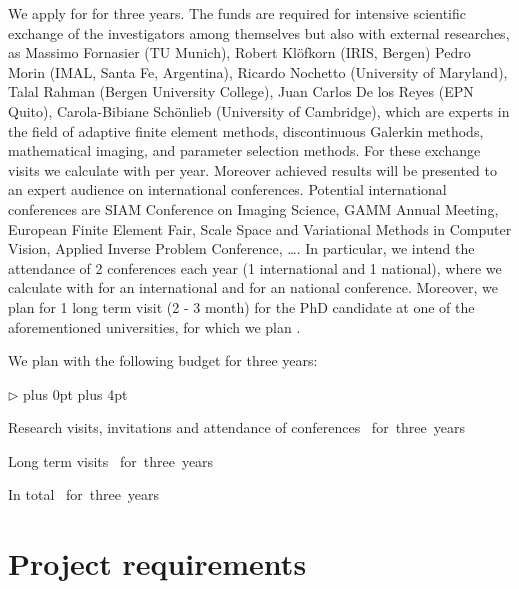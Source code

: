 \documentclass[enabledeprecatedfontcommands,cleardoublepage=empty,headsepline,twoside,11pt,DIV=15,BCOR=12mm,final]{scrartcl}
\renewenvironment{itemize}
{\begin{list}{$\triangleright$}{\labelwidth-2mm \leftmargin3mm %
  \itemsep5pt plus 0pt  \topsep3pt \parsep1pt plus 4pt \labelsep2mm}}
{\end{list}}
\begin{document}
We apply for  for three years. The funds are required for intensive scientific exchange of the investigators among themselves but also with external researches, as Massimo Fornasier (TU Munich), Robert Kl\"ofkorn (IRIS, Bergen) Pedro Morin (IMAL, Santa Fe, Argentina), Ricardo Nochetto (University of Maryland), Talal Rahman (Bergen University College), Juan Carlos De los Reyes (EPN Quito),  Carola-Bibiane Sch\"onlieb (University of Cambridge), which are experts in the field of adaptive finite element methods, discontinuous Galerkin methods, mathematical imaging, and parameter selection methods. For these exchange visits we calculate with  per year. Moreover achieved results will be presented to an expert audience on international conferences. Potential international conferences are SIAM Conference on Imaging Science, GAMM Annual Meeting, European Finite Element Fair, Scale Space and Variational Methods in Computer Vision, Applied Inverse Problem Conference, \dots. In particular, we intend the attendance of 2 conferences each year (1 international and 1 national), where we calculate with  for an international and  for an national conference. Moreover, we plan for 1 long term visit (2 - 3 month) for the PhD candidate at one of the aforementioned universities, for which we plan .

We plan with the following budget for three years:
\begin{itemize}\itemsep=-1pt
\item Research visits, invitations and attendance of conferences \dotfill\hbox{  for three years}

  \item Long term visits  \dotfill\hbox{ for three years}
\item In total  \dotfill\hbox{ for three years}
\end{itemize}

\section{Project requirements}
\label{sec:requirements}
\end{document}
